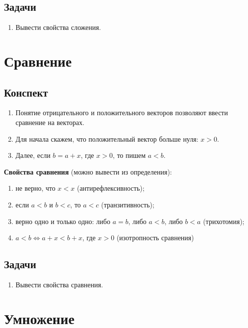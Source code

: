 \subsection*{Задачи}
\begin{enumerate}
\item Вывести свойства сложения.
\end{enumerate}



\section{Сравнение}

\subsection*{Конспект}
\begin{enumerate}
\item Понятие отрицательного и положительного векторов позволяют ввести сравнение на векторах.
\item Для начала скажем, что положительный вектор больше нуля: $x>0$.
\item Далее, если $b=a+x$, где $x>0$, то пишем $a<b$.
\end{enumerate}

\textbf{Свойства сравнения} (можно вывести из определения):
\begin{enumerate}[label=O\arabic*]
\item не верно, что $x<x$ (антирефлексивность);
\item если $a<b$ и $b<c$, то $a<c$ (транзитивность);
\item верно одно и только одно: либо $a=b$, либо $a<b$, либо $b<a$ (трихотомия);
\item $a<b\Leftrightarrow a+x<b+x$, где $x>0$ (изотропность сравнения)
\end{enumerate}

\subsection*{Задачи}
\begin{enumerate}
\item Вывести свойства сравнения.
\end{enumerate}





\section{Умножение}

